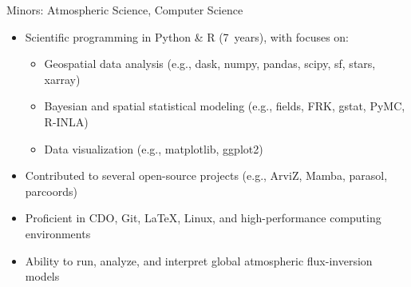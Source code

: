 \documentclass[10pt,letterpaper,ragged2e,withhyper]{altacv}
\begin{document}
\begin{paracol}{2}

  
  \vspace{-0.75em}
  \divider


  \vspace{-0.75em}
  \divider

  {\small Minors: Atmospheric Science, Computer Science}

  \medskip

  \begin{itemize}
    \item Scientific programming in Python \& R (7~years), with focuses on:
      \begin{itemize}
        \item Geospatial data analysis (e.g., dask, numpy, pandas, scipy, sf, stars, xarray)
        \item Bayesian and spatial statistical modeling (e.g., fields, FRK, gstat, PyMC, R-INLA)
        \item Data visualization (e.g., matplotlib, ggplot2)
      \end{itemize}
    \item Contributed to several open-source projects (e.g., ArviZ, Mamba, parasol, parcoords)
    \item Proficient in CDO, Git, LaTeX, Linux, and high-performance computing environments
    \item Ability to run, analyze, and interpret global atmospheric flux-inversion models
  \end{itemize}


\end{paracol}
\end{document}

